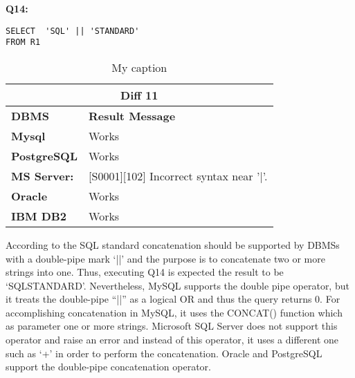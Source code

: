 \begin{mdframed}[backgroundcolor=gray!20] 
\textbf{Q14:}
\begin{lstlisting}
SELECT  'SQL' || 'STANDARD'
FROM R1
\end{lstlisting}
\end{mdframed} 
 
\begin{table}[]
\centering
\caption{My caption}
\label{my-label}
\begin{tabular}{|l|l|}
\hline
\multicolumn{2}{|c|}{\textbf{Diff 11}}                                                                              \\ \hline
\textbf{DBMS}                              & \textbf{Result Message}                                                \\ \hline
{\color[HTML]{333333} \textbf{Mysql}}      & {\color[HTML]{333333} Works}                                           \\ \hline
{\color[HTML]{333333} \textbf{PostgreSQL}} & {\color[HTML]{333333} Works}                                           \\ \hline
{\color[HTML]{333333} \textbf{MS Server:}} & {\color[HTML]{333333} {[}S0001{]}{[}102{]} Incorrect syntax near '|'.} \\ \hline
\textbf{Oracle}                            & Works                                                                  \\ \hline
\textbf{IBM DB2}                           & Works                                                                  \\ \hline
\end{tabular}
\end{table}

According to the SQL standard concatenation should be supported by DBMSs with a double-pipe mark ‘||’ and the purpose is to concatenate two or more strings into one. Thus, executing Q14 is expected the result to be ‘SQLSTANDARD’. Nevertheless, MySQL supports the double pipe operator, but it treats the double-pipe “||” as a logical OR and thus the query returns 0. For accomplishing concatenation in MySQL, it uses the CONCAT() function which as parameter one or more strings.   Microsoft SQL Server does not support this operator and raise an error and instead of this operator, it uses a different one such as ‘+’  in order to perform the concatenation. Oracle and PostgreSQL support the double-pipe  concatenation operator. 



